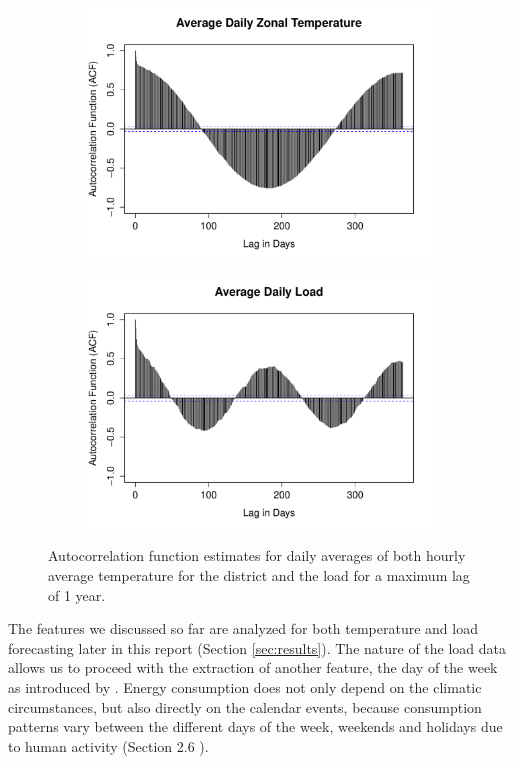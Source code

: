 \documentclass[conference]{IEEEtran}
\begin{document}
\begin{figure}[!ht]
\centering
\begin{subfigure}[b]{.49\linewidth}
\includegraphics[width=\linewidth]{gfx/daily-avg-temp-1year.pdf}
\label{subfig:acf-temp-1year}
\end{subfigure}
\begin{subfigure}[b]{.49\linewidth}
\includegraphics[width=\linewidth]{gfx/avg-daily-load-1year.pdf}
\label{subfig:acf-load-1year}
\end{subfigure}
\caption{Autocorrelation function estimates for daily averages of both hourly average temperature for the district and the load for a maximum lag of 1 year.}
\label{fig:seasonality}
\end{figure}
The features we discussed so far are analyzed for both temperature and load forecasting later in this report (Section \ref{sec:results}). The nature of the load data allows us to proceed with the extraction of another feature, the day of the week as introduced by \cite{Hong2010}. Energy consumption does not only depend on the climatic circumstances, but also directly on the calendar events, because consumption patterns vary between the different days of the week, weekends and holidays due to human activity (Section 2.6 \cite{HongThesis}). 
\end{document}
